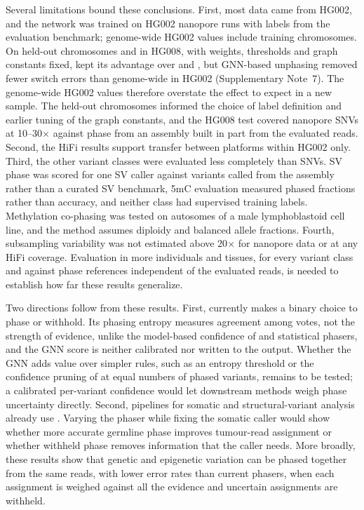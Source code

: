 Several limitations bound these conclusions. First, most data came from HG002, and the network was trained on HG002 nanopore runs with labels from the evaluation benchmark; genome-wide HG002 values include training chromosomes. On held-out chromosomes and in HG008, with weights, thresholds and graph constants fixed, \toolname kept its advantage over \whatshap and \hapcut, but GNN-based unphasing removed fewer switch errors than genome-wide in HG002 (Supplementary Note~7). The genome-wide HG002 values therefore overstate the effect to expect in a new sample. The held-out chromosomes informed the choice of label definition and earlier tuning of the graph constants, and the HG008 test covered nanopore SNVs at 10--30$\times$ against phase from an assembly built in part from the evaluated reads. Second, the HiFi results support transfer between platforms within HG002 only. Third, the other variant classes were evaluated less completely than SNVs. SV phase was scored for one SV caller against variants called from the assembly rather than a curated SV benchmark, 5mC evaluation measured phased fractions rather than accuracy, and neither class had supervised training labels. Methylation co-phasing was tested on autosomes of a male lymphoblastoid cell line\cite{fu2024methphaser}, and the method assumes diploidy and balanced allele fractions. Fourth, subsampling variability was not estimated above 20$\times$ for nanopore data or at any HiFi coverage. Evaluation in more individuals and tissues, for every variant class and against phase references independent of the evaluated reads, is needed to establish how far these results generalize.

Two directions follow from these results. First, \toolname currently makes a binary choice to phase or withhold. Its phasing entropy measures agreement among votes, not the strength of evidence, unlike the model-based confidence of \hapcut\cite{edge2017hapcut2} and statistical phasers\cite{hofmeister2023shapeit5}, and the GNN score is neither calibrated nor written to the output. Whether the GNN adds value over simpler rules, such as an entropy threshold or the confidence pruning of \hapcut at equal numbers of phased variants, remains to be tested; a calibrated per-variant confidence would let downstream methods weigh phase uncertainty directly. Second, pipelines for somatic and structural-variant analysis already use \longphase\cite{zheng2022clair3,zheng2026clairs,keskus2025severus,ont2025wfhuman}. Varying the phaser while fixing the somatic caller would show whether more accurate germline phase improves tumour-read assignment or whether withheld phase removes information that the caller needs. More broadly, these results show that genetic and epigenetic variation can be phased together from the same reads, with lower error rates than current phasers, when each assignment is weighed against all the evidence and uncertain assignments are withheld.
